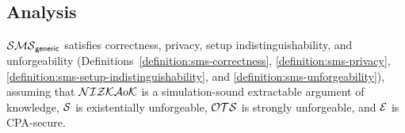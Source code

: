 \subsection{Analysis}\label{subsection:generic-SMS-analysis}

\begin{theorem}[Security]\label{theorem:SMS-generic-construction-security}
$\mathcal{SMS}_{\mathsf{generic}}$ satisfies correctness, privacy, setup indistinguishability,
and unforgeability
(Definitions~\ref{definition:sms-correctness},
\ref{definition:sms-privacy},
\ref{definition:sms-setup-indistinguishability},
and \ref{definition:sms-unforgeability}),
assuming that $\mathcal{NIZKA}o\mathcal{K}$ is a simulation-sound extractable argument of knowledge,
$\mathcal{S}$ is existentially unforgeable,
$\mathcal{OTS}$ is strongly unforgeable,
and $\mathcal{E}$ is CPA-secure.
\end{theorem}


